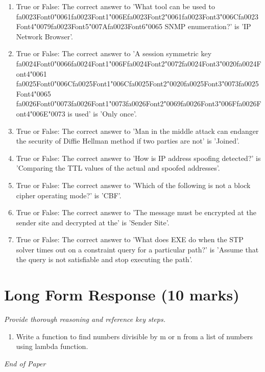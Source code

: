 \documentclass[12pt]{article}
\begin{document}
\begin{enumerate}[label=\arabic*.]
\item True or False: The correct answer to 'What tool can be used to {\csname fa0023Font0\endcsname\char"0061}{\csname fa0023Font1\endcsname\char"006E}{\csname fa0023Font2\endcsname\char"0061}{\csname fa0023Font3\endcsname\char"006C}{\csname fa0023Font4\endcsname\char"0079}{\csname fa0023Font5\endcsname\char"007A}{\csname fa0023Font6\endcsname\char"0065} SNMP enumeration?' is 'IP Network Browser'.
\item True or False: The correct answer to 'A session symmetric key {\csname fa0024Font0\endcsname\char"0066}{\csname fa0024Font1\endcsname\char"006F}{\csname fa0024Font2\endcsname\char"0072}{\csname fa0024Font3\endcsname\char"0020}{\csname fa0024Font4\endcsname\char"0061} {\csname fa0025Font0\endcsname\char"006C}{\csname fa0025Font1\endcsname\char"006C}{\csname fa0025Font2\endcsname\char"0020}{\csname fa0025Font3\endcsname\char"0073}{\csname fa0025Font4\endcsname\char"0065} {\csname fa0026Font0\endcsname\char"0073}{\csname fa0026Font1\endcsname\char"0073}{\csname fa0026Font2\endcsname\char"0069}{\csname fa0026Font3\endcsname\char"006F}{\csname fa0026Font4\endcsname\char"006E}{\char"0073} is used' is 'Only once'.
\item True or False: The correct answer to 'Man in the middle attack can endanger the security of Diffie Hellman method if two parties are not' is 'Joined'.
\item True or False: The correct answer to 'How is IP address spoofing detected?' is 'Comparing the TTL values of the actual and spoofed addresses'.
\item True or False: The correct answer to 'Which of the following is not a block cipher operating mode?' is 'CBF'.
\item True or False: The correct answer to 'The message must be encrypted at the sender site and decrypted at the' is 'Sender Site'.
\item True or False: The correct answer to 'What does EXE do when the STP solver times out on a constraint query for a particular path?' is 'Assume that the query is not satisfiable and stop executing the path'.
\end{enumerate}

\section*{Long Form Response (10 marks)}
\textit{Provide thorough reasoning and reference key steps.}
\begin{enumerate}[label=\arabic*.]
\item Write a function to find numbers divisible by m or n from a list of numbers using lambda
function.
\end{enumerate}

\vfill
\noindent\textit{End of Paper}
\end{document}
